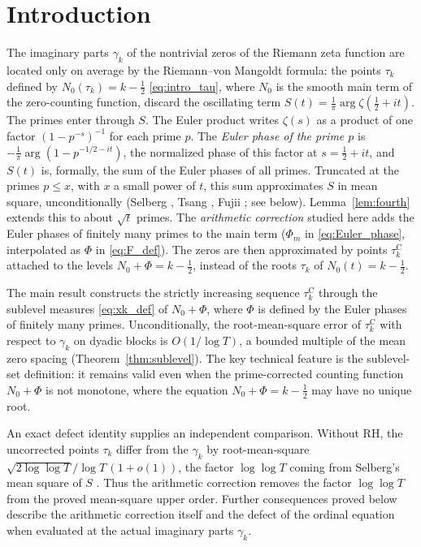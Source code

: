 \documentclass[11pt,a4paper]{article}
\makeatletter
\numberwithin{equation}{section}
\DeclareRobustCommand{\CGref}[1]{\ref{#1}}
\DeclareRobustCommand{\CGeqref}[1]{\eqref{#1}}
\DeclareRobustCommand{\CGcite}[2][]{\if\relax\detokenize{#1}\relax\cite{#2}\else\cite[#1]{#2}\fi}
\let\CG@origref\ref
\let\CG@origeqref\eqref
\newcommand{\CG@gettip}[1]{\@ifundefined{CGTip@#1}{#1}{\csname CGTip@#1\endcsname}}
\newcommand{\CG@getbib}[1]{\@ifundefined{CGBib@#1}{#1}{\csname CGBib@#1\endcsname}}
\DeclareRobustCommand{\CGref}[1]{\pdftooltip{\CG@origref{#1}}{\CG@gettip{#1}}}
\DeclareRobustCommand{\CGeqref}[1]{\pdftooltip{\CG@origeqref{#1}}{\CG@gettip{#1}}}
\DeclareRobustCommand{\CGcite}[2][]{\pdftooltip{\if\relax\detokenize{#1}\relax\cite{#2}\else\cite[#1]{#2}\fi}{\CG@getbib{#2}}}
\theoremstyle{definition}
\theoremstyle{remark}
\newcommand{\Nz}{N_0} %
\newcommand{\Ph}{\Phi}
\makeatother
\begin{document}
\section{Introduction}\label{sec:intro}
The imaginary parts $\gamma_k$ of the nontrivial zeros of the Riemann zeta function are located only on average by the Riemann--von Mangoldt formula: the points $\tau_k$ defined by $\Nz(\tau_k)=k-\frac12$ \CGeqref{eq:intro_tau}, where $\Nz$ is the smooth main term of the zero-counting function, discard the oscillating term $S(t)=\frac1\pi\arg\zeta(\frac12+it)$. The primes enter through $S$. The Euler product writes $\zeta(s)$ as a product of one factor $(1-p^{-s})^{-1}$ for each prime $p$. The \emph{Euler phase of the prime $p$} is $-\frac1\pi\arg(1-p^{-1/2-it})$, the normalized phase of this factor at $s=\frac12+it$, and $S(t)$ is, formally, the sum of the Euler phases of all primes. Truncated at the primes $p\le x$, with $x$ a small power of $t$, this sum approximates $S$ in mean square, unconditionally (Selberg \CGcite{Selberg1946a}, Tsang \CGcite{Tsang1984}, Fujii \CGcite{Fujii1974}; see below). Lemma~\CGref{lem:fourth} extends this to about $\sqrt t$ primes. The \emph{arithmetic correction} studied here adds the Euler phases of finitely many primes to the main term ($\Ph_m$ in \CGeqref{eq:Euler_phase}, interpolated as $\Ph$ in \CGeqref{eq:F_def}). The zeros are then approximated by points $\tau_k^{\mathrm C}$ attached to the levels $\Nz+\Ph=k-\frac12$, instead of the roots $\tau_k$ of $\Nz(t)=k-\frac12$.

The main result constructs the strictly increasing sequence $\tau_k^{\mathrm C}$ through the sublevel measures \CGeqref{eq:xk_def} of $\Nz+\Ph$, where $\Ph$ is defined by the Euler phases of finitely many primes. Unconditionally, the root-mean-square error of $\tau_k^{\mathrm C}$ with respect to $\gamma_k$ on dyadic blocks is $O(1/\log T)$, a bounded multiple of the mean zero spacing (Theorem~\CGref{thm:sublevel}). The key technical feature is the sublevel-set definition: it remains valid even when the prime-corrected counting function $\Nz+\Ph$ is not monotone, where the equation $\Nz+\Ph=k-\frac12$ may have no unique root.

An exact defect identity supplies an independent comparison. Without RH, the uncorrected points $\tau_k$ differ from the $\gamma_k$ by root-mean-square $\sqrt{2\log\log T}/\log T\,(1+o(1))$, the factor $\log\log T$ coming from Selberg's mean square of $S$ \CGcite{Selberg1946a}. Thus the arithmetic correction removes the factor $\log\log T$ from the proved mean-square upper order. Further consequences proved below describe the arithmetic correction itself and the defect of the ordinal equation when evaluated at the actual imaginary parts $\gamma_k$.
\end{document}
